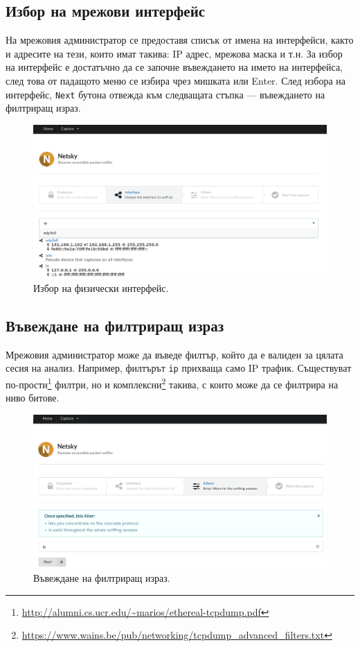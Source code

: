 \documentclass[12pt,a4paper,oneside]{book}
\begin{document}
\subsection{Избор на мрежови интерфейс}

На мрежовия администратор се предоставя списък от имена на интерфейси, както и
адресите на тези, които имат такива: IP адрес, мрежова маска и т.н. За избор на
интерфейс е достатъчно да се започне въвеждането на името на интерфейса, след
това от падащото меню се избира чрез мишката или Enter. След избора на интерфейс,
\texttt{Next} бутона отвежда към следващата стъпка ---
въвеждането на филтриращ израз.

\begin{figure}[h!]
  \centering
  \includegraphics[width=\textwidth]{figures/screenshots/interface.png}
  \caption{Избор на физически интерфейс.}
  \label{screenshots_interface_fig}
\end{figure}

\subsection{Въвеждане на филтриращ израз}

Мрежовия администратор може да въведе филтър, който да е валиден за цялата сесия
на анализ. Например, филтърът \texttt{ip} прихваща само IP трафик. Съществуват
по-прости\footnote{\url{http://alumni.cs.ucr.edu/~marios/ethereal-tcpdump.pdf}}
филтри,
но и
комплексни\footnote{\url{https://www.wains.be/pub/networking/tcpdump_advanced_filters.txt}}
такива, с които може да се филтрира на ниво битове.

\begin{figure}[h!]
  \centering
  \includegraphics[width=\textwidth]{figures/screenshots/filter.png}
  \caption{Въвеждане на филтриращ израз.}
  \label{screenshots_filter_fig}
\end{figure}
\end{document}
